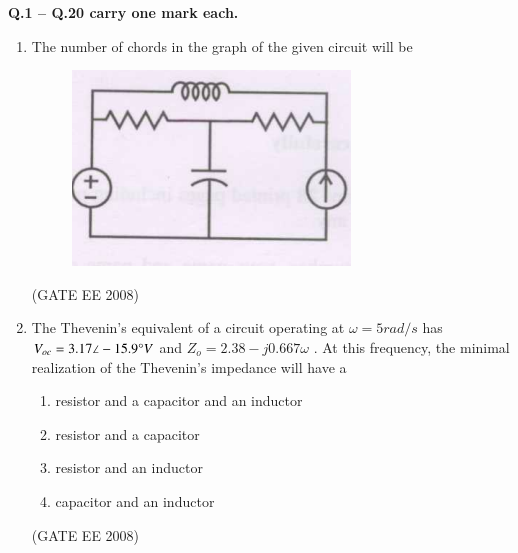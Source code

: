 \documentclass[journal,12pt,onecolumn]{IEEEtran}
\theoremstyle{remark}
\begin{document}
     \Large\textbf{Q.1 -- Q.20 carry one mark each.} \\[10mm]


\begin{enumerate}[start=1, label=Q.\arabic*]
    \item The number of chords in the graph of the given circuit will be
\begin{figure}[H]
    \centering
    \includegraphics[width=\columnwidth]{Fig/q1.png}
    \caption{}
\end{figure}


\begin{enumerate}
\end{enumerate}
\hfill (GATE EE 2008)




\item The Thevenin's equivalent of a circuit operating at $\omega=5rad/s$ has $V_{oc}=3.17 \angle - 15.9 \degree V$ and $Z_o = 2.38 - j0.667\omega$ . At this frequency, the minimal
realization of the Thevenin's impedance will have a

\begin{multicols}{2}
\begin{enumerate}

\item resistor and a capacitor and an inductor
\item resistor and a capacitor
\item resistor and an inductor
\item capacitor and an inductor
\end{enumerate}
\end{multicols}
\hfill (GATE EE 2008)






\end{enumerate}
\end{document}
